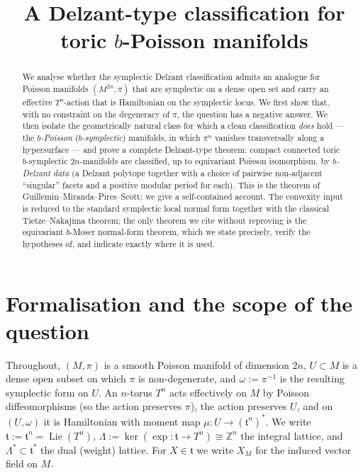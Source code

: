 \documentclass{amsart}
\theoremstyle{definition}
\begin{document}
\title{A Delzant-type classification for toric $b$-Poisson manifolds}
\maketitle

\begin{abstract}
We analyse whether the symplectic Delzant classification admits an analogue for
Poisson manifolds $(M^{2n},\pi)$ that are symplectic on a dense open set and
carry an effective $T^n$-action that is Hamiltonian on the symplectic locus. We
first show that, with no constraint on the degeneracy of $\pi$, the question has
a negative answer. We then isolate the geometrically natural class for which a
clean classification \emph{does} hold --- the \emph{$b$-Poisson}
(\emph{$b$-symplectic}) manifolds, in which $\pi^n$ vanishes transversally along
a hypersurface --- and prove a complete Delzant-type theorem: compact connected
toric $b$-symplectic $2n$-manifolds are classified, up to equivariant Poisson
isomorphism, by \emph{$b$-Delzant data} (a Delzant polytope together with a
choice of pairwise non-adjacent ``singular'' facets and a positive modular
period for each). This is the theorem of Guillemin--Miranda--Pires--Scott; we
give a self-contained account. The convexity input is reduced to the standard
symplectic local normal form together with the classical Tietze--Nakajima
theorem; the only theorem we cite without reproving is the equivariant $b$-Moser
normal-form theorem, which we state precisely, verify the hypotheses of, and
indicate exactly where it is used.
\end{abstract}

\section{Formalisation and the scope of the question}

Throughout, $(M,\pi)$ is a smooth Poisson manifold of dimension $2n$,
$U\subset M$ is a dense open subset on which $\pi$ is non-degenerate, and
$\omega:=\pi^{-1}$ is the resulting symplectic form on $U$. An $n$-torus $T^n$
acts effectively on $M$ by Poisson diffeomorphisms (so the action preserves
$\pi$), the action preserves $U$, and on $(U,\omega)$ it is Hamiltonian with
moment map $\mu\colon U\to(\mathfrak t^n)^*$. We write
$\mathfrak t:=\mathfrak t^n=\operatorname{Lie}(T^n)$,
$\Lambda:=\ker(\exp\colon\mathfrak t\to T^n)\cong\mathbb Z^n$ the integral
lattice, and $\Lambda^*\subset\mathfrak t^*$ the dual (weight) lattice. For
$X\in\mathfrak t$ we write $X_M$ for the induced vector field on $M$.
\end{document}
